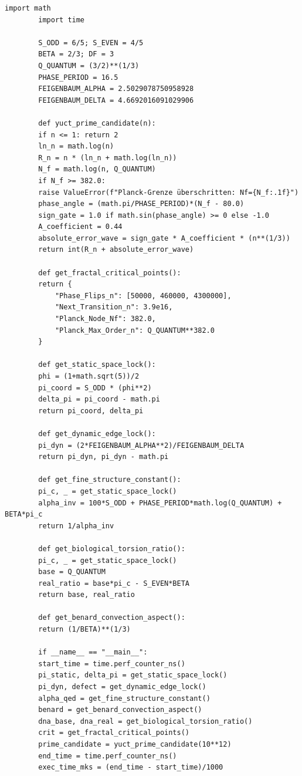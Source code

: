 \documentclass[12pt,a4paper]{article}
\begin{document}
	\begin{lstlisting}[caption={Vollständige YUCT-Koordinations-Engine v4.0 (\texttt{yuct\_constants.py})}, label={lst:yuct-engine}]
		import math
		import time
		
		S_ODD = 6/5; S_EVEN = 4/5
		BETA = 2/3; DF = 3
		Q_QUANTUM = (3/2)**(1/3)
		PHASE_PERIOD = 16.5
		FEIGENBAUM_ALPHA = 2.5029078750958928
		FEIGENBAUM_DELTA = 4.6692016091029906
		
		def yuct_prime_candidate(n):
		if n <= 1: return 2
		ln_n = math.log(n)
		R_n = n * (ln_n + math.log(ln_n))
		N_f = math.log(n, Q_QUANTUM)
		if N_f >= 382.0:
		raise ValueError(f"Planck-Grenze überschritten: Nf={N_f:.1f}")
		phase_angle = (math.pi/PHASE_PERIOD)*(N_f - 80.0)
		sign_gate = 1.0 if math.sin(phase_angle) >= 0 else -1.0
		A_coefficient = 0.44
		absolute_error_wave = sign_gate * A_coefficient * (n**(1/3))
		return int(R_n + absolute_error_wave)
		
		def get_fractal_critical_points():
		return {
			"Phase_Flips_n": [50000, 460000, 4300000],
			"Next_Transition_n": 3.9e16,
			"Planck_Node_Nf": 382.0,
			"Planck_Max_Order_n": Q_QUANTUM**382.0
		}
		
		def get_static_space_lock():
		phi = (1+math.sqrt(5))/2
		pi_coord = S_ODD * (phi**2)
		delta_pi = pi_coord - math.pi
		return pi_coord, delta_pi
		
		def get_dynamic_edge_lock():
		pi_dyn = (2*FEIGENBAUM_ALPHA**2)/FEIGENBAUM_DELTA
		return pi_dyn, pi_dyn - math.pi
		
		def get_fine_structure_constant():
		pi_c, _ = get_static_space_lock()
		alpha_inv = 100*S_ODD + PHASE_PERIOD*math.log(Q_QUANTUM) + BETA*pi_c
		return 1/alpha_inv
		
		def get_biological_torsion_ratio():
		pi_c, _ = get_static_space_lock()
		base = Q_QUANTUM
		real_ratio = base*pi_c - S_EVEN*BETA
		return base, real_ratio
		
		def get_benard_convection_aspect():
		return (1/BETA)**(1/3)
		
		if __name__ == "__main__":
		start_time = time.perf_counter_ns()
		pi_static, delta_pi = get_static_space_lock()
		pi_dyn, defect = get_dynamic_edge_lock()
		alpha_qed = get_fine_structure_constant()
		benard = get_benard_convection_aspect()
		dna_base, dna_real = get_biological_torsion_ratio()
		crit = get_fractal_critical_points()
		prime_candidate = yuct_prime_candidate(10**12)
		end_time = time.perf_counter_ns()
		exec_time_mks = (end_time - start_time)/1000
		

\end{lstlisting}
\end{document}
